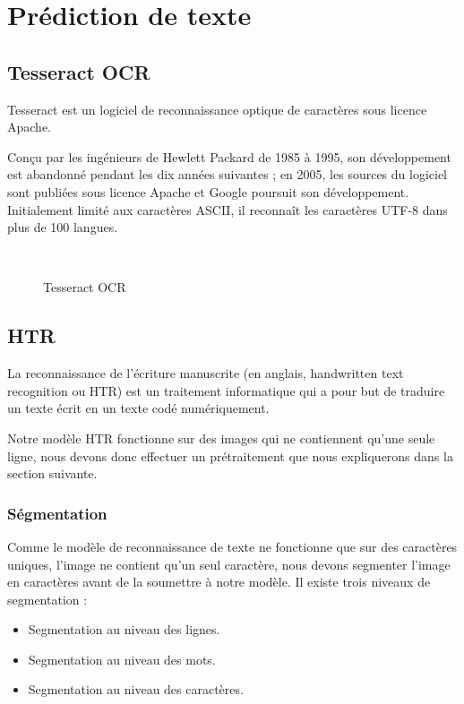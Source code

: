 {\section{Prédiction de texte}
\subsection{Tesseract OCR}
Tesseract est un logiciel de reconnaissance optique de caractères sous licence Apache.

Conçu par les ingénieurs de Hewlett Packard de 1985 à 1995, son développement est abandonné pendant les dix années suivantes ; en 2005, les sources du logiciel sont publiées sous licence Apache et Google poursuit son développement. Initialement limité aux caractères ASCII, il reconnaît les caractères UTF-8 dans plus de 100 langues.\\[0.5cm]

\begin{figure}[H] 
\centering
{}\\[0.5cm]
\caption{Tesseract OCR}
\label{fig:figure14}
\end{figure}

\subsection{HTR}
La reconnaissance de l’écriture manuscrite (en anglais, handwritten text recognition ou HTR) est un traitement informatique qui a pour but de traduire un texte écrit en un texte codé numériquement.

Notre modèle HTR fonctionne sur des images qui ne contiennent qu'une seule ligne, nous devons donc effectuer un prétraitement que nous expliquerons dans la section suivante. 
\subsubsection{Ségmentation}
Comme le modèle de reconnaissance de texte ne fonctionne que sur des caractères uniques, l'image ne contient qu'un seul caractère, nous devons segmenter l'image en caractères avant de la soumettre à notre modèle.
Il existe trois niveaux de segmentation : 
\begin{itemize}
    \item Segmentation au niveau des lignes.
    \item Segmentation au niveau des mots.
    \item Segmentation au niveau des caractères.
\end{itemize}

}
